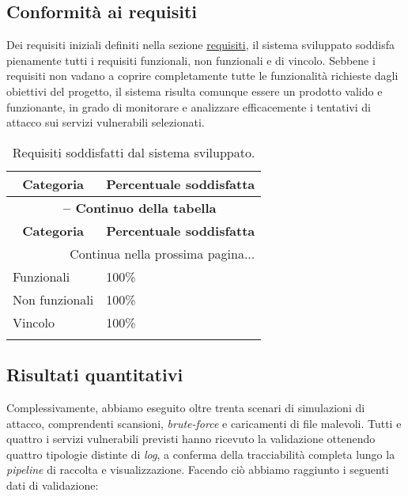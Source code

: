 \subsection*{Conformità ai requisiti}
\label{requisiti-soddisfatti}
Dei requisiti iniziali definiti nella sezione \hyperref[requisiti]{requisiti}, il sistema sviluppato soddisfa pienamente tutti i requisiti funzionali, non funzionali e di vincolo.
Sebbene i requisiti non vadano a coprire completamente tutte le funzionalità richieste dagli obiettivi del progetto, il sistema risulta comunque essere un prodotto valido e funzionante, in grado di monitorare e analizzare efficacemente i tentativi di attacco sui servizi vulnerabili selezionati.
\begin{center}
\begin{longtable}{|p{}|p{}|}
\hline
\multicolumn{1}{|c|}{\textbf{Categoria}} & \multicolumn{1}{c|}{\textbf{Percentuale soddisfatta}}\\ 
\hline 
\endfirsthead
\multicolumn{2}{c}{{\bfseries \tablename\ \thetable{} -- Continuo della tabella}}\\
\hline
\multicolumn{1}{|c|}{\textbf{Categoria}} & \multicolumn{1}{c|}{\textbf{Percentuale soddisfatta}}\\ \hline 
\endhead
\hline
\multicolumn{2}{|r|}{{Continua nella prossima pagina...}}\\
\hline
\endfoot
\endlastfoot 

Funzionali & 100\%\\ \hline
Non funzionali & 100\%\\ \hline
Vincolo & 100\%\\ \hline
\caption{Requisiti soddisfatti dal sistema sviluppato.}
\label{tab:requisiti-soddisfatti}
\end{longtable}
\end{center}

\subsection*{Risultati quantitativi}
Complessivamente, abbiamo eseguito oltre trenta scenari di simulazioni di attacco, comprendenti scansioni, \textit{brute-force} e caricamenti di file malevoli. Tutti e quattro i servizi vulnerabili previsti hanno ricevuto la validazione ottenendo quattro tipologie distinte di \textit{log}, a conferma della tracciabilità completa lungo la \textit{pipeline} di raccolta e visualizzazione.
Facendo ciò abbiamo raggiunto i seguenti dati di validazione:

